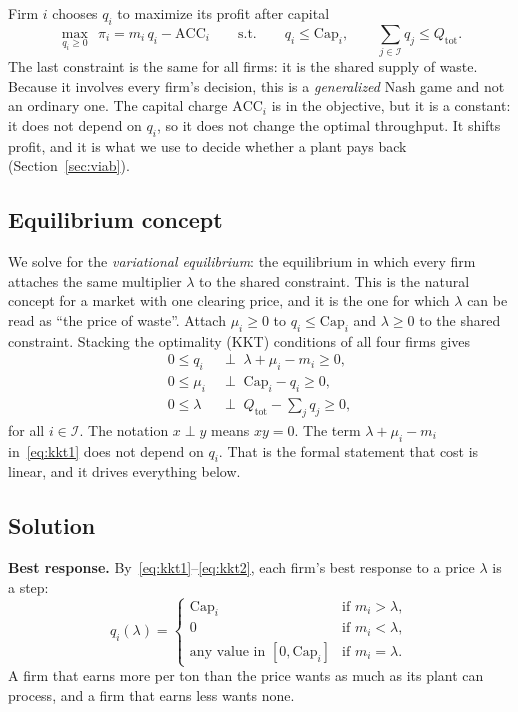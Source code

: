 \documentclass[11pt]{article}
\begin{document}
Firm $i$ chooses $q_i$ to maximize its profit after capital
\begin{equation}
\max_{q_i\ge 0}\ \ \pi_i = m_i\,q_i-\mathrm{ACC}_i
\qquad\text{s.t.}\qquad q_i\le \mathrm{Cap}_i,
\qquad
\sum_{j\in\mathcal I} q_j \le Q_{\mathrm{tot}} .
\label{eq:firm}
\end{equation}
The last constraint is the same for all firms: it is the shared supply of waste.
Because it involves every firm's decision, this is a \emph{generalized} Nash
game and not an ordinary one. The capital charge $\mathrm{ACC}_i$ is in the
objective, but it is a constant: it does not depend on $q_i$, so it does not change
the optimal throughput. It shifts profit, and it is what we use to decide whether a
plant pays back (Section~\ref{sec:viab}).

\subsection{Equilibrium concept}

We solve for the \emph{variational equilibrium}: the equilibrium in which every
firm attaches the same multiplier $\lambda$ to the shared constraint. This is the
natural concept for a market with one clearing price, and it is the one for which
$\lambda$ can be read as ``the price of waste''. Attach $\mu_i\ge0$ to
$q_i\le\mathrm{Cap}_i$ and $\lambda\ge0$ to the shared constraint. Stacking the
optimality (KKT) conditions of all four firms gives
\begin{align}
0 \le q_i &\;\perp\; \lambda+\mu_i-m_i \ge 0, \label{eq:kkt1}\\
0 \le \mu_i &\;\perp\; \mathrm{Cap}_i-q_i \ge 0, \label{eq:kkt2}\\
0 \le \lambda &\;\perp\; Q_{\mathrm{tot}}-\textstyle\sum_{j} q_j \ge 0 ,\label{eq:kkt3}
\end{align}
for all $i\in\mathcal I$. The notation $x\perp y$ means $xy=0$. The term
$\lambda+\mu_i-m_i$ in~\eqref{eq:kkt1} does not depend on $q_i$. That is the
formal statement that cost is linear, and it drives everything below.

\subsection{Solution}

\textbf{Best response.} By~\eqref{eq:kkt1}--\eqref{eq:kkt2}, each firm's best
response to a price $\lambda$ is a step:
\begin{equation}
q_i(\lambda)=
\begin{cases}
\mathrm{Cap}_i & \text{if } m_i>\lambda,\\
0 & \text{if } m_i<\lambda,\\
\text{any value in }[0,\mathrm{Cap}_i] & \text{if } m_i=\lambda .
\end{cases}
\label{eq:br}
\end{equation}
A firm that earns more per ton than the price wants as much as its plant can
process, and a firm that earns less wants none.
\end{document}
